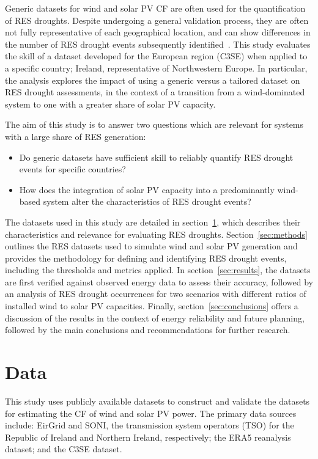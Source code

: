 \documentclass[preprint, 12pt]{elsarticle}
\begin{document}
Generic datasets for wind and solar PV CF are often used for the quantification of RES droughts. Despite undergoing a general validation process, they are often not fully representative of each geographical location, and can show differences in the number of RES drought events subsequently identified~\citep{kies2021drought}. This study evaluates the skill of a dataset developed for the European region (C3SE) when applied to a specific country; Ireland, representative of Northwestern Europe. In particular, the analysis explores the impact of using a generic versus a tailored dataset on RES drought assessments, in the context of a transition from a wind-dominated system to one with a greater share of solar PV capacity.

The aim of this study is to answer two questions which are relevant for systems with a large share of RES generation:
\begin{itemize}
	\item Do generic datasets have sufficient skill to reliably quantify RES drought events for specific countries?
	\item How does the integration of solar PV capacity into a predominantly wind-based system alter the characteristics of RES drought events?
\end{itemize}

The datasets used in this study are detailed in section~\ref{sec:data}, which describes their characteristics and relevance for evaluating RES droughts. Section~\ref{sec:methods} outlines the RES datasets used to simulate wind and solar PV generation and provides the methodology for defining and identifying RES drought events, including the thresholds and metrics applied. In section~\ref{sec:results}, the datasets are first verified against observed energy data to assess their accuracy, followed by an analysis of RES drought occurrences for two scenarios with different ratios of installed wind to solar PV capacities. Finally, section~\ref{sec:conclusions} offers a discussion of the results in the context of energy reliability and future planning, followed by the main conclusions and recommendations for further research.

\section{Data}
\label{sec:data}

This study uses publicly available datasets to construct and validate the datasets for estimating the CF of wind and solar PV power. The primary data sources include: EirGrid and SONI, the transmission system operators (TSO) for the Republic of Ireland and Northern Ireland, respectively; the ERA5 reanalysis dataset; and the C3SE dataset.
\end{document}
